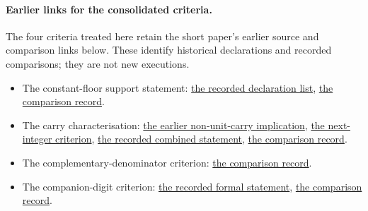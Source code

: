 \paragraph{Earlier links for the consolidated criteria.}\label{long68:sec:short-criteria-sources}
The four criteria treated here retain the short paper's earlier source
and comparison links below. These identify historical declarations and
recorded comparisons; they are not new executions.
\begin{itemize}
\item The constant-floor support statement: \href{https://github.com/wcook04/plectis-erdos/blob/897f55801d7d184aaa2ce8fb19e7b701c9c23d94/evidence/erdos-68-factorial-denominator-irrationality.md#res-bandbreakpoint}{the recorded declaration list}, \href{https://github.com/wcook04/plectis-erdos/blob/897f55801d7d184aaa2ce8fb19e7b701c9c23d94/evidence/erdos-68-factorial-denominator-irrationality.md#res-bandbreakpoint-comparator}{the comparison record}.
\item The carry characterisation: \href{https://github.com/wcook04/plectis-erdos/blob/99f4bf47422abbd8757cbb22b50ba079d764d3a7/ErdosProblems/Erdos68/FactorialZeroPlateau.lean#L953}{the earlier non-unit-carry implication}, \href{https://github.com/wcook04/plectis-erdos/blob/99f4bf47422abbd8757cbb22b50ba079d764d3a7/ErdosProblems/Erdos68/FactorialZeroPlateau.lean#L1090}{the next-integer criterion}, \href{https://github.com/wcook04/plectis-erdos/blob/436f55ebdafa67e4af0fff79f621c13f2ded12bf/lean/ErdosProblems/Erdos68/PaperCompleteExisting.lean#L27}{the recorded combined statement}, \href{https://github.com/wcook04/plectis-erdos/blob/897f55801d7d184aaa2ce8fb19e7b701c9c23d94/evidence/erdos-68-factorial-denominator-irrationality.md#res-carry-characterization-comparator}{the comparison record}.
\item The complementary-denominator criterion: \href{https://github.com/wcook04/plectis-erdos/blob/897f55801d7d184aaa2ce8fb19e7b701c9c23d94/evidence/erdos-68-factorial-denominator-irrationality.md#res-global-complementary-criterion-comparator}{the comparison record}.
\item The companion-digit criterion: \href{https://github.com/wcook04/plectis-erdos/blob/436f55ebdafa67e4af0fff79f621c13f2ded12bf/lean/ErdosProblems/Erdos68/PaperCompleteExisting.lean#L45}{the recorded formal statement}, \href{https://github.com/wcook04/plectis-erdos/blob/897f55801d7d184aaa2ce8fb19e7b701c9c23d94/evidence/erdos-68-factorial-denominator-irrationality.md#res-companion-orbit-rationality-boundary-comparator}{the comparison record}.
\end{itemize}

